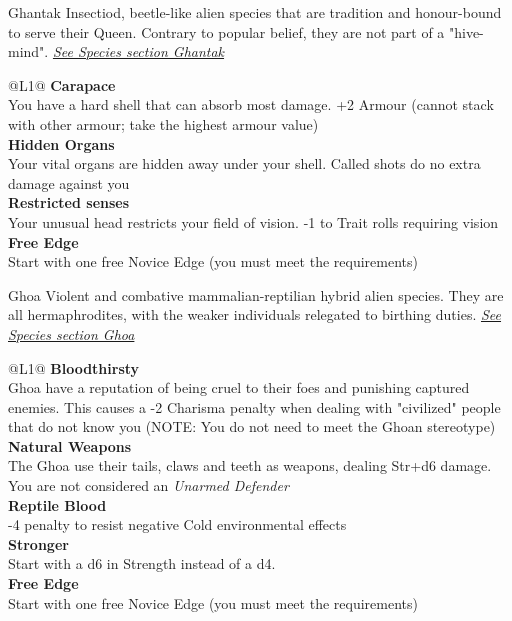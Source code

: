 \begin{genericsection}{Ghantak}
  Insectiod, beetle-like alien species that are tradition and honour-bound to serve their Queen. Contrary to popular belief, they are not part of a "hive-mind". \textit{\hyperref[sec:specie-ghantak]{See Species section Ghantak}}
\end{genericsection}
\begin{redtable}{\linewidth}{@{}L{1}@{}}
  \textbf{Carapace}\\
  You have a hard shell that can absorb most damage. +2 Armour (cannot stack with other armour; take the highest armour value)\\
  \textbf{Hidden Organs}\\
  Your vital organs are hidden away under your shell. Called shots do no extra damage against you\\
  \textbf{Restricted senses}\\
  Your unusual head restricts your field of vision. -1 to Trait rolls requiring vision\\
  \textbf{Free Edge}\\
  Start with one free Novice Edge (you must meet the requirements)\\
\end{redtable}
  
\begin{genericsection}{Ghoa}
  Violent and combative mammalian-reptilian hybrid alien species. They are all hermaphrodites, with the weaker individuals relegated to birthing duties. \textit{\hyperref[sec:specie-ghoa]{See Species section Ghoa}}
\end{genericsection}
\begin{redtable}{\linewidth}{@{}L{1}@{}}
  \textbf{Bloodthirsty}\\
  Ghoa have a reputation of being cruel to their foes and punishing captured enemies. This causes a -2 Charisma penalty when dealing with "civilized" people that do not know you (NOTE: You do not need to meet the Ghoan stereotype)\\
  \textbf{Natural Weapons}\\
  The Ghoa use their tails, claws and teeth as weapons, dealing Str+d6 damage. You are not considered an \textit{Unarmed Defender}\\
  \textbf{Reptile Blood}\\
  -4 penalty to resist negative Cold environmental effects\\
  \textbf{Stronger}\\
  Start with a d6 in Strength instead of a d4.\\
  \textbf{Free Edge}\\
  Start with one free Novice Edge (you must meet the requirements)\\
\end{redtable}
  
